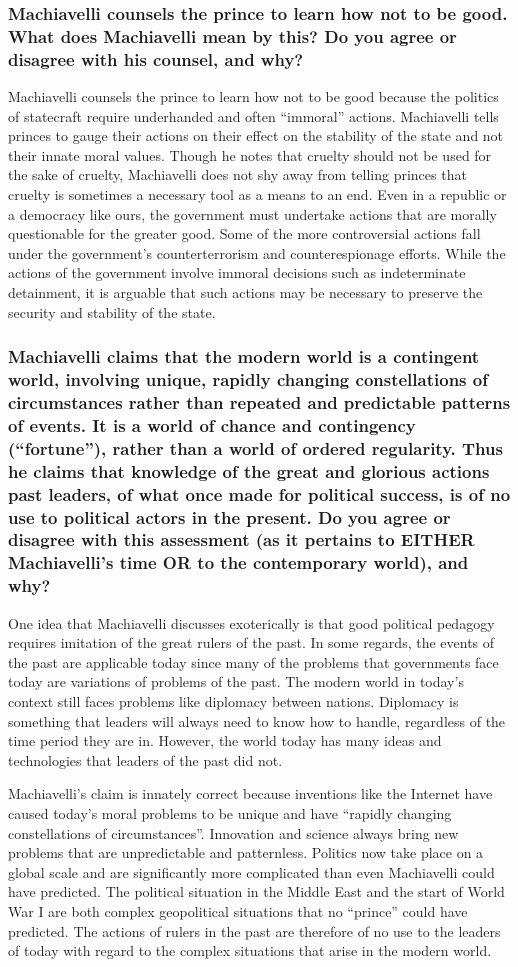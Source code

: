 \documentclass{article}
\begin{document}
\subsubsection*{Machiavelli counsels the prince to learn how not to be good.
What does Machiavelli mean by this? Do you agree or disagree with his counsel,
and why?}
Machiavelli counsels the prince to learn how not to be good because the politics of statecraft require underhanded and often ``immoral'' actions. Machiavelli tells princes to gauge their actions on their effect on the stability of the state and not their innate moral values. Though he notes that cruelty should not be used for the sake of cruelty, Machiavelli does not shy away from telling princes that cruelty is sometimes a necessary tool as a means to an end. Even in a republic or a democracy like ours, the government must undertake actions that are morally questionable for the greater good. Some of the more controversial actions fall under the government's counterterrorism and counterespionage efforts. While the actions of the government involve immoral decisions such as indeterminate detainment, it is arguable that such actions may be necessary to preserve the security and stability of the state.

\subsubsection*{Machiavelli claims that the modern world is a contingent world,
involving unique, rapidly changing constellations of circumstances rather than
repeated and predictable patterns of events. It is a world of chance and
contingency (``fortune''), rather than a world of ordered regularity. Thus he
claims that knowledge of the great and glorious actions past leaders, of what
once made for political success, is of no use to political actors in the
present. Do you agree or disagree with this assessment (as it pertains to
EITHER Machiavelli’s time OR to the contemporary world), and why?}
One idea that Machiavelli discusses exoterically is that good political pedagogy requires imitation of the great rulers of the past. In some regards, the events of the past are applicable today since many of the problems that governments face today are variations of problems of the past. The modern world in today's context still faces problems like diplomacy between nations. Diplomacy is something that leaders will always need to know how to handle, regardless of the time period they are in. However, the world today has many ideas and technologies that leaders of the past did not. \par
Machiavelli's claim is innately correct because inventions like the Internet have caused today's moral problems to be unique and have ``rapidly changing constellations of circumstances''. Innovation and science always bring new problems that are unpredictable and patternless. Politics now take place on a global scale and are significantly more complicated than even Machiavelli could have predicted. The political situation in the Middle East and the start of World War I are both complex geopolitical situations that no ``prince'' could have predicted. The actions of rulers in the past are therefore of no use to the leaders of today with regard to the complex situations that arise in the modern world.
\end{document}
